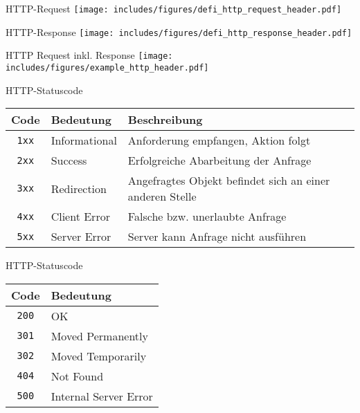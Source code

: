 \begin{defi}{HTTP-Request}
    \centering
    \texttt{[image: includes/figures/defi\_http\_request\_header.pdf]}
\end{defi}

\begin{defi}{HTTP-Response}
    \centering
    \texttt{[image: includes/figures/defi\_http\_response\_header.pdf]}
\end{defi}

\begin{example}{HTTP Request inkl. Response}
    \texttt{[image: includes/figures/example\_http\_header.pdf]}
\end{example}

\begin{bonus}{HTTP-Statuscode}
    \begin{center}
        \begin{tabular}{|c|l|l|}
            \hline
            Code         & Bedeutung     & Beschreibung                                             \\\hline\hline
            \texttt{1xx} & Informational & Anforderung empfangen, Aktion folgt                      \\\hline
            \texttt{2xx} & Success       & Erfolgreiche Abarbeitung der Anfrage                     \\\hline
            \texttt{3xx} & Redirection   & Angefragtes Objekt befindet sich an einer anderen Stelle \\\hline
            \texttt{4xx} & Client Error  & Falsche bzw. unerlaubte Anfrage                          \\\hline
            \texttt{5xx} & Server Error  & Server kann Anfrage nicht ausführen                      \\\hline
        \end{tabular}
    \end{center}
\end{bonus}

\begin{example}{HTTP-Statuscode}
    \begin{center}
        \begin{tabular}{|c|l|}
            \hline
            Code         & Bedeutung             \\\hline\hline
            \texttt{200} & OK                    \\\hline
            \texttt{301} & Moved Permanently     \\\hline
            \texttt{302} & Moved Temporarily     \\\hline
            \texttt{404} & Not Found             \\\hline
            \texttt{500} & Internal Server Error \\\hline
        \end{tabular}
    \end{center}
\end{example}

